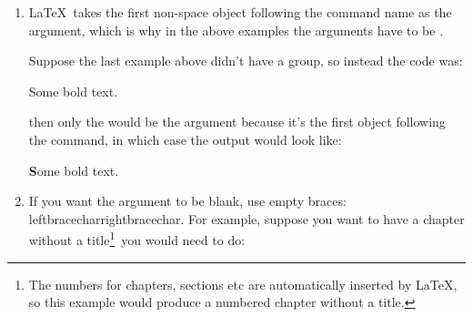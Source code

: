 \begin{enumerate}
\item\label{itm:argnogrp} \LaTeX\ takes the first non-space object
following the command name as the argument, which is why in the
above
examples the arguments have to be .

Suppose the last example above didn't have a group, so instead the
code was:
\begin{codeS}
 Some bold text.
\end{codeS}%
then only the  would be the argument because it's the first
object
following the command, in which case the output would look like:
\begin{resultS}
\textbf Some bold text.
\end{resultS}

\item If you want the argument to be blank, use empty braces:
\gls{leftbracechar}\gls{rightbracechar}.  For example, suppose you
want to have a
chapter without a title\protect\footnote{The numbers for chapters, sections
etc are automatically inserted by \LaTeX, so this example would
produce a numbered chapter without a title.}\ you would need to do:
\begin{codeS}
\marg{}
\end{codeS}
\end{enumerate}
